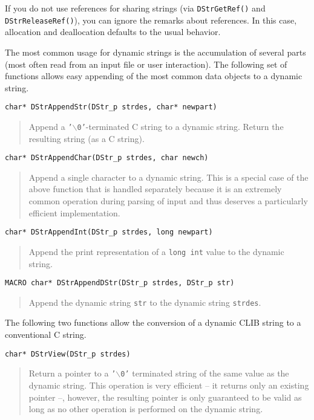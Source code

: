 If you do not use references for sharing strings (via
\texttt{DStrGetRef()} and \texttt{DStrReleaseRef()}), you can ignore
the remarks about references. In this case, allocation and
deallocation defaults to the usual behavior.

The most common usage for dynamic strings is the accumulation of
several parts (most often read from an input file or user
interaction). The following set of functions allows easy appending of
the most common data objects to a dynamic string.

\begin{verbatim}
char* DStrAppendStr(DStr_p strdes, char* newpart)
\end{verbatim}
\begin{quote}
  Append a \texttt{'$\backslash{}$0'}-terminated C string to a dynamic
  string. Return the resulting string (as a C string).
\end{quote}

\begin{verbatim}
char* DStrAppendChar(DStr_p strdes, char newch)
\end{verbatim}
\begin{quote}
  Append a single character to a dynamic string. This is a special
  case of the above function that is handled separately because it is
  an extremely common operation during parsing of input and thus
  deserves a particularly efficient implementation.
\end{quote}

\begin{verbatim}
char* DStrAppendInt(DStr_p strdes, long newpart)
\end{verbatim}
\begin{quote}
  Append the print representation of a \texttt{long int} value to the
  dynamic string.
\end{quote}

\begin{verbatim}
MACRO char* DStrAppendDStr(DStr_p strdes, DStr_p str)
\end{verbatim}
\begin{quote}
  Append the dynamic string \texttt{str} to the dynamic string
  \texttt{strdes}.
\end{quote}

The following two functions allow the conversion of a dynamic CLIB
string to a conventional C string.

\begin{verbatim}
char* DStrView(DStr_p strdes)
\end{verbatim}
\begin{quote}
  Return a pointer to a \texttt{'$\backslash{}$0'} terminated string
  of the same value as the dynamic string. This operation is very
  efficient -- it returns only an existing pointer --, however, the
  resulting pointer is only guaranteed to be valid as long as no other
  operation is performed on the dynamic string.
\end{quote}

